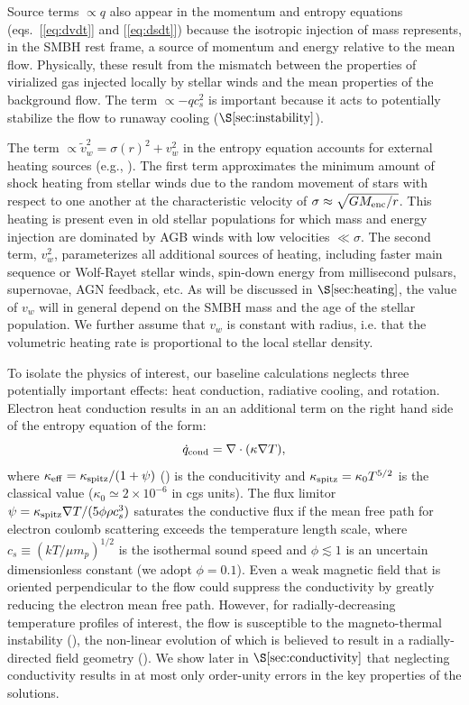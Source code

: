 \documentclass[usenatbib,fleqn]{mn2e}
\newcommand{\vw}{\tilde{v}_{w}}
\begin{document}
Source terms $\propto q$ also appear in the momentum and entropy
equations (eqs.~[\ref{eq:dvdt}] and [\ref{eq:dsdt}]) because the isotropic injection of mass represents, in the SMBH rest frame, a source of momentum
and energy relative to the mean flow.  Physically, these result from
the mismatch between the properties of virialized gas injected locally
by stellar winds and the mean properties of the background flow.  The
term $\propto -q c_{s}^{2}$ is important because it acts to potentially stabilize the flow to runaway cooling ($\S\ref{sec:instability}$).

The term $\propto \vw^2 = \sigma(r)^2+v_{w}^2$ in the entropy equation
accounts for external heating sources (e.g.,
\citealt{ShcherbakovWong+:2014a}).  The first term approximates the
minimum amount of shock heating from stellar winds due to the random
movement of stars with respect to one another at the characteristic
velocity of $\sigma \approx \sqrt{GM_{\rm enc}/r}$.  This heating is
present even in old stellar populations for which mass and energy
injection are dominated by AGB winds with low velocities $\ll \sigma$.
The second term, $v_{w}^{2}$, parameterizes all additional sources of
heating, including faster main sequence or Wolf-Rayet stellar winds,
spin-down energy from millisecond pulsars, supernovae, AGN feedback,
etc.  As will be discussed in $\S\ref{sec:heating}$, the value of
$v_{w}$ will in general depend on the SMBH mass and the age of the
stellar population.  We further assume that $v_w$ is constant with
radius, i.e. that the volumetric heating rate is proportional to the
local stellar density.

To isolate the physics of interest, our baseline calculations neglects three potentially important effects: heat conduction, radiative cooling, and rotation.  Electron heat conduction results in an an additional term on the right hand side of the entropy equation of the form:  
\begin{equation}
\dot{q}_{\rm cond} = \nabla\cdot(\kappa \nabla T),
\label{eq:qdotcond}
 \end{equation}
where $\kappa_{\rm
  eff}=\kappa_{\rm spitz}/(1+\psi)$ (\citealt{DaltonBalbus:1993a}) is
the conducitivity and $\kappa_{\rm spitz} = \kappa_0 T^{5/2}$ is the
classical \citet{Spitzer62} value ($\kappa_0\simeq 2\times 10^{-6}$ in
cgs units).  The flux limitor $\psi = \kappa_{\rm spitz} \nabla
T/(5\phi \rho c_s^3)$ saturates the conductive flux if the mean free
path for electron coulomb scattering exceeds the
temperature length scale, where $c_s \equiv (kT/\mu m_p)^{1/2}$ is the
isothermal sound speed and $\phi \lesssim 1$ is an uncertain
dimensionless constant (we adopt $\phi = 0.1$).  Even a weak magnetic
field that is oriented perpendicular to the flow could suppress the
conductivity by greatly reducing the electron mean free path.  However, for radially-decreasing temperature profiles
of interest, the flow is susceptible to the magneto-thermal instability (\citealt{Balbus01}), the non-linear evolution of which is believed to result in a radially-directed field geometry (\citealt{Parrish&Stone07}).  We show later in $\S\ref{sec:conductivity}$ that neglecting conductivity results in at most only order-unity errors in the key properties of the solutions.
\end{document}
